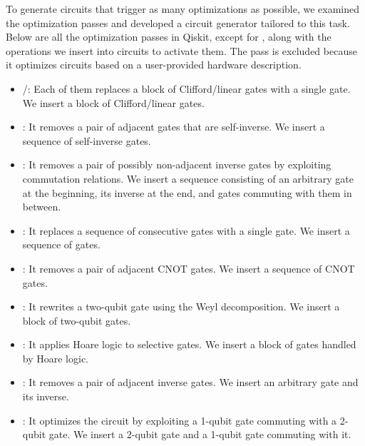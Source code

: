 To generate circuits that trigger as many optimizations as possible, we
examined the optimization passes and developed a circuit generator tailored to
this task.
%
Below are all the optimization passes in Qiskit, except for
, along with the operations we insert into
circuits to activate them.
%
The  pass is excluded because it optimizes
circuits based on a user-provided hardware description.
%
\begin{itemize}[leftmargin=*]
	\item {}/:
	      Each of them replaces a block of Clifford/linear gates with a single gate.
	      We insert a block of Clifford/linear gates.
	\item {}:
	      It removes a pair of adjacent gates that are self-inverse.
	      We insert a sequence of self-inverse gates.
	\item {}:
	      It removes a pair of possibly non-adjacent inverse gates by exploiting
	      commutation relations.
	      We insert a sequence consisting of an arbitrary gate at the beginning, its
	      inverse at the end, and gates commuting with them in between.
	\item {}:
	      It replaces a sequence of consecutive gates with a single gate.
	      We insert a sequence of gates.
	\item {}:
	      It removes a pair of adjacent CNOT gates.
	      We insert a sequence of CNOT gates.
	\item {}:
	      It rewrites a two-qubit gate using the Weyl decomposition.
	      We insert a block of two-qubit gates.
	\item {}:
	      It applies Hoare logic to selective gates.
	      We insert a block of gates handled by Hoare logic.
	\item {}:
	      It removes a pair of adjacent inverse gates.
	      We insert an arbitrary gate and its inverse. \item
	      :
	      It optimizes the circuit by exploiting a 1-qubit gate commuting with a 2-qubit
	      gate.
	      We insert a 2-qubit gate and a 1-qubit gate commuting with it.

\end{itemize}
